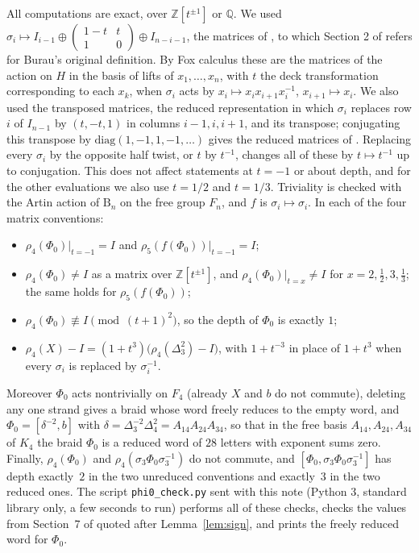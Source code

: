 \documentclass[11pt]{amsart}
\theoremstyle{remark}
\newcommand{\B}{\mathrm{B}}
\newcommand{\at}{\big|_{t=-1}}
\begin{document}
All computations are exact, over $\mathbb{Z}[t^{\pm1}]$ or $\mathbb{Q}$. We used $\sigma_i\mapsto I_{i-1}\oplus\begin{pmatrix}1-t&t\\1&0\end{pmatrix}\oplus I_{n-i-1}$, the matrices of \cite[Section~4.2]{BB05}, to which Section 2 of \cite{BBB} refers for Burau's original definition. By Fox calculus these are the matrices of the action on $H$ in the basis of lifts of $x_1,\dots,x_n$, with $t$ the deck transformation corresponding to each $x_k$, when $\sigma_i$ acts by ${x_i\mapsto x_ix_{i+1}x_i^{-1}}$, ${x_{i+1}\mapsto x_i}$. We also used the transposed matrices, the reduced representation in which $\sigma_i$ replaces row $i$ of $I_{n-1}$ by $(t,-t,1)$ in columns $i-1,i,i+1$, and its transpose; conjugating this transpose by $\mathrm{diag}(1,-1,1,-1,\dots)$ gives the reduced matrices of \cite[\mbox{Section~4.2}]{BB05}. Replacing every $\sigma_i$ by the opposite half twist, or $t$ by $t^{-1}$, changes all of these by $t\mapsto t^{-1}$ up to conjugation. This does not affect statements at $t=-1$ or about depth, and for the other evaluations we also use $t=1/2$ and $t=1/3$. Triviality is checked with the Artin action of $\B_n$ on the free group $F_n$, and $f$ is $\sigma_i\mapsto\sigma_i$. In each of the four matrix conventions:
\begin{itemize}
\item $\rho_4(\Phi_0)\at=I$ and $\rho_5(f(\Phi_0))\at=I$;
\item $\rho_4(\Phi_0)\neq I$ as a matrix over $\mathbb{Z}[t^{\pm1}]$, and $\rho_4(\Phi_0)|_{t=x}\neq I$ for $x=2,\tfrac12,3,\tfrac13$; the same holds for $\rho_5(f(\Phi_0))$;
\item $\rho_4(\Phi_0)\not\equiv I\pmod{(t+1)^2}$, so the depth of $\Phi_0$ is exactly $1$;
\item $\rho_4(X)-I=(1+t^3)\bigl(\rho_4(\Delta_3^2)-I\bigr)$, with $1+t^{-3}$ in place of $1+t^3$ when every $\sigma_i$ is replaced by $\sigma_i^{-1}$.
\end{itemize}
Moreover $\Phi_0$ acts nontrivially on $F_4$ (already $X$ and $b$ do not commute), deleting any one strand gives a braid whose word freely reduces to the empty word, and $\Phi_0=[\delta^{-2},b]$ with $\delta=\Delta_3^{-2}\Delta_4^2=A_{14}A_{24}A_{34}$, so that in the free basis $A_{14},A_{24},A_{34}$ of $K_4$ the braid $\Phi_0$ is a reduced word of $28$ letters with exponent sums zero. Finally, $\rho_4(\Phi_0)$ and $\rho_4(\sigma_3\Phi_0\sigma_3^{-1})$ do not commute, and $[\Phi_0,\sigma_3\Phi_0\sigma_3^{-1}]$ has depth exactly~$2$ in the two unreduced conventions and exactly~$3$ in the two reduced ones. The script \verb|phi0_check.py| sent with this note (Python 3, standard library only, a few seconds to run) performs all of these checks, checks the values from Section~7 of \cite{BBB} quoted after Lemma~\ref{lem:sign}, and prints the freely reduced word for $\Phi_0$.
\end{document}
